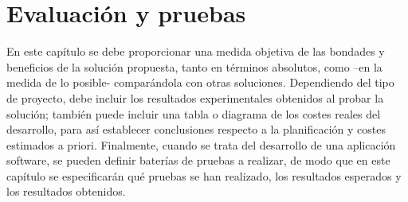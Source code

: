 \chapter{Evaluación y pruebas}

En este capítulo se debe proporcionar una medida objetiva de las bondades y beneficios de la solución propuesta, tanto en términos absolutos, como –en la medida de lo posible- comparándola con otras soluciones. Dependiendo del tipo de proyecto, debe incluir los resultados experimentales obtenidos al probar la solución; también puede incluir una tabla o diagrama de los costes reales del desarrollo, para así establecer conclusiones respecto a la planificación y costes estimados a priori. Finalmente, cuando se trata del desarrollo de una aplicación software, se pueden definir baterías de pruebas a realizar, de modo que en este capítulo se especificarán qué pruebas se han realizado, los resultados esperados y los resultados obtenidos. 
